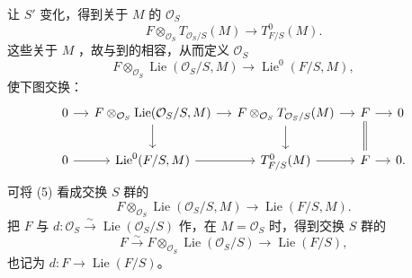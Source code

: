 让 $S'$ 变化，得到关于 $M$ 的 $\mathcal O_S$ 
\[F\otimes_{\mathcal O_S}T_{\mathcal O_S/S}(M)\to T^0_{F/S}(M).\tag{4}\]
这些关于 $M$ ，故与到的相容，从而定义 $\mathcal O_S$ 
\[F\otimes_{\mathcal O_S}\operatorname{Lie}(\mathcal O_S/S,M)\to\operatorname{Lie}^0(F/S,M),\tag{5}\]
使下图交换：
\[\begin{tikzcd}[column sep=small]
0\arrow[r]&F\otimes_{\mathcal O_S}\operatorname{Lie}(\mathcal O_S/S,M)\arrow[r]\arrow[d]&F\otimes_{\mathcal O_S}T_{\mathcal O_S/S}(M)\arrow[r]\arrow[d]&F\arrow[r]\arrow[d,equal]&0\\
0\arrow[r]&\operatorname{Lie}^0(F/S,M)\arrow[r]&T^0_{F/S}(M)\arrow[r]&F\arrow[r]&0.
\end{tikzcd}\]
可将 (5) 看成交换 $S$ 群的
\[F\otimes_{\mathcal O_S}\operatorname{Lie}(\mathcal O_S/S,M)\to\operatorname{Lie}(F/S,M).\tag{6}\]
把 $F$ 与 $d:\mathcal O_S\xrightarrow{\sim}\operatorname{Lie}(\mathcal O_S/S)$ 作，在 $M=\mathcal O_S$ 时，得到交换 $S$ 群的
\[F\xrightarrow{\sim}F\otimes_{\mathcal O_S}\operatorname{Lie}(\mathcal O_S/S)\to\operatorname{Lie}(F/S),\tag{7}\]
也记为 $d:F\to\operatorname{Lie}(F/S)$。

